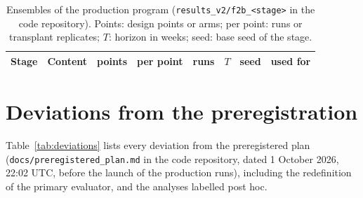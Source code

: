 \documentclass[pre,onecolumn,superscriptaddress,notitlepage]{revtex4-2}
\begin{document}
\begin{table}[ht]
\centering
\caption{Ensembles of the production program (\texttt{results\_v2/f2b\_<stage>} in the code repository). Points:
design points or arms; per point: runs or transplant replicates; $T$: horizon in weeks; seed: base seed of the
stage.}
\label{tab:res-ensembles}
\scriptsize
\setlength{\tabcolsep}{4pt}
\begin{tabular}{@{}llrrrrrl@{}}
\toprule
Stage & Content & points & per point & runs & $T$ & seed & used for \\
\midrule

\end{tabular}
\end{table}

\section{Deviations from the preregistration}
\label{supp:deviations}

Table~\ref{tab:deviations} lists every deviation from the preregistered plan (\texttt{docs/preregistered\_plan.md} in the
code repository, dated 1 October 2026, 22:02 UTC, before the launch of the production runs), including the
redefinition of the primary evaluator, and the analyses labelled post hoc.
\end{document}
